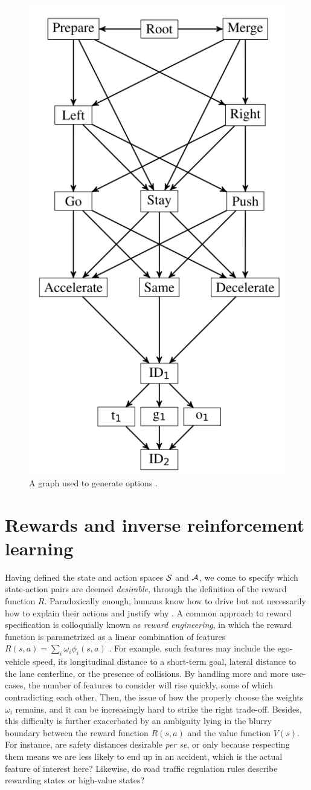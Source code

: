 \begin{figure}[th]
	\centering
	\includegraphics[width=0.3\linewidth]{img/options}
	\caption{A graph used to generate options \citep{ShalevShwartz2016}.}
	\label{fig:options-graph}
\end{figure}

\section{Rewards and inverse reinforcement learning}

Having defined the state and action spaces $\mathcal{S}$ and $\mathcal{A}$, we come to specify which state-action pairs are deemed \emph{desirable}, through the definition of the reward function $R$. Paradoxically enough, humans know how to drive but not necessarily how to explain their actions and justify why . A common approach to reward specification is colloquially known as \emph{reward engineering}, in which the reward function is parametrized as a linear combination of features $R(s,a) = \sum_i \omega_i \phi_i(s,a)$ . For example, such features may include the ego-vehicle speed, its longitudinal distance to a short-term goal, lateral distance to the lane centerline, or the presence of collisions.
By handling more and more use-cases, the number of features to consider will rise quickly, some of which contradicting each other. Then, the issue of how the properly choose the weights $\omega_i$ remains, and it can be increasingly hard to strike the right trade-off.
Besides, this difficulty is further exacerbated by an ambiguity lying in the blurry boundary between the reward function $R(s,a)$ and the value function $V(s)$. For instance, are safety distances desirable \textit{per se}, or only because respecting them means we are less likely to end up in an accident, which is the actual feature of interest here? Likewise, do road traffic regulation rules describe rewarding states or high-value states?

